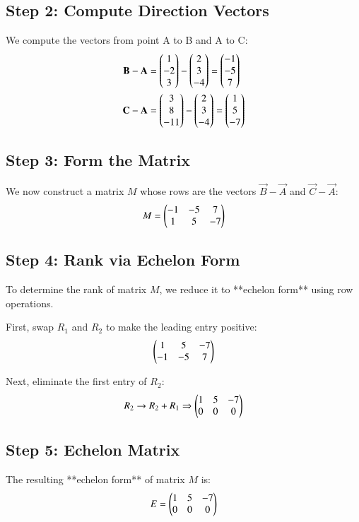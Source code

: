 \documentclass[journal]{IEEEtran}
\begin{document}
\subsection*{Step 2: Compute Direction Vectors}
We compute the vectors from point A to B and A to C:
\begin{align}
\mathbf{B} - \mathbf{A} &= \begin{pmatrix}1\\-2\\3\end{pmatrix} - \begin{pmatrix}2\\3\\-4\end{pmatrix} = \begin{pmatrix}-1\\-5\\7\end{pmatrix} \\
\mathbf{C} - \mathbf{A} &= \begin{pmatrix}3\\8\\-11\end{pmatrix} - \begin{pmatrix}2\\3\\-4\end{pmatrix} = \begin{pmatrix}1\\5\\-7\end{pmatrix}
\end{align}

\subsection*{Step 3: Form the Matrix}
We now construct a matrix $M$ whose rows are the vectors $\vec{B} - \vec{A}$ and $\vec{C} - \vec{A}$:
\begin{equation}
M = \begin{pmatrix}-1 & -5 & 7\\1 & 5 & -7\end{pmatrix}
\label{eq:matrix}
\end{equation}

\subsection*{Step 4: Rank via Echelon Form}
To determine the rank of matrix $M$, we reduce it to **echelon form** using row operations.

First, swap $R_1$ and $R_2$ to make the leading entry positive:
\begin{equation}
\begin{pmatrix}1 & 5 & -7\\-1 & -5 & 7\end{pmatrix}
\label{eq:swap}
\end{equation}

Next, eliminate the first entry of $R_2$:
\begin{equation}
R_2 \rightarrow R_2 + R_1 \Rightarrow
\begin{pmatrix}1 & 5 & -7\\0 & 0 & 0\end{pmatrix}
\label{eq:echelon}
\end{equation}

\subsection*{Step 5: Echelon Matrix}
The resulting **echelon form** of matrix $M$ is:
\begin{equation}
E = \begin{pmatrix}1 & 5 & -7\\0 & 0 & 0\end{pmatrix}
\label{eq:echelon_matrix}
\end{equation}
\end{document}
